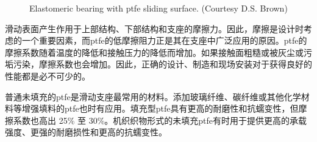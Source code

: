 \begin{figure}
  \caption{Elastomeric bearing with \acrshort{ptfe} sliding surface. (Courtesy D.S. Brown)}\label{fig:elastomeric-bearing-ptfe}
\end{figure}

滑动表面产生作用于上部结构、下部结构和支座的摩擦力。因此，摩擦是设计时考虑的一个重要因素，而\acrlong*{ptfe}的低摩擦阻力正是其在支座中广泛应用的原因。\acrlong*{ptfe}的摩擦系数随着温度的降低和接触压力的降低而增加。如果接触面粗糙或被灰尘或污垢污染，摩擦系数也会增加。因此，正确的设计、制造和现场安装对于获得良好的性能都是必不可少的。

普通未填充的\acrlong*{ptfe}是滑动支座最常用的材料。添加玻璃纤维、碳纤维或其他化学材料等增强填料的\acrlong*{ptfe}也时有应用。填充型\acrlong*{ptfe}具有更高的耐磨性和抗蠕变性，但摩擦系数也高出 25\% 至 30\%。机织织物形式的未填充\acrlong*{ptfe}有时用于提供更高的承载强度、更强的耐磨损性和更高的抗蠕变性。

